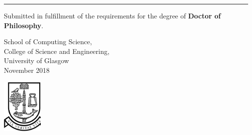 
\begin{titlepage}

\relax

\begin{addmargin}[-1cm]{0cm}
\begin{flushleft}
\large

\hfill
\vfill

\begin{minipage}{12cm}
\begin{flushleft}
\textbf{\headingfont\fontsize{54}{100}\selectfont{Real-Time Event Detection using Twitter}}
\vspace{0.15cm}
\end{flushleft}
\end{minipage}

{\color{RoyalBlue}\noindent\rule{3cm}{1.75pt}}


\vspace{4cm}

\vfill

\noindent
\begin{minipage}{0.7\textwidth}
\begin{flushleft}

	Submitted in fulfillment of the requirements for the degree of \textbf{Doctor of Philosophy}.\\

	\vspace{1cm}

	School of Computing Science, \\
	College of Science and Engineering, \\
	University of Glasgow \\

	\bigskip
	\vfill
	\small{November 2018} %

\end{flushleft}
\end{minipage}
\hfill
\begin{minipage}{0.3\textwidth}

\begin{flushright}
\vspace{2cm}
\includegraphics[width=2cm]{Graphics/university-of-glasgow-logo.ps}
\end{flushright}
\end{minipage}

\end{flushleft}
\end{addmargin}

\end{titlepage}